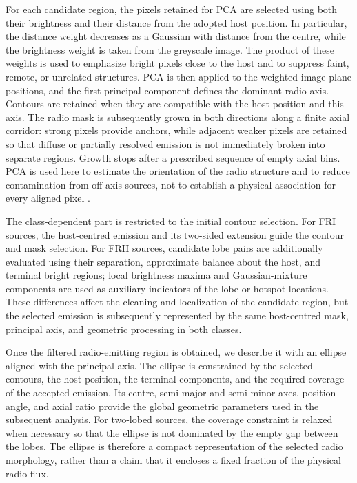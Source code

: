 \documentclass{aa}
\begin{document}
For each candidate region, the pixels retained for PCA are selected using both their brightness and their distance from the adopted host position. In particular, the distance weight decreases as a Gaussian with distance from the centre, while the brightness weight is taken from the greyscale image. The product of these weights is used to emphasize bright pixels close to the host and to suppress faint, remote, or unrelated structures. PCA is then applied to the weighted image-plane positions, and the first principal component defines the dominant radio axis. Contours are retained when they are compatible with the host position and this axis. The radio mask is subsequently grown in both directions along a finite axial corridor: strong pixels provide anchors, while adjacent weaker pixels are retained so that diffuse or partially resolved emission is not immediately broken into separate regions. Growth stops after a prescribed sequence of empty axial bins. PCA is used here to estimate the orientation of the radio structure and to reduce contamination from off-axis sources, not to establish a physical association for every aligned pixel \citep[e.g., PCA tomography,][]{hofmann_kernel_2008,steiner_pca_2009}.

The class-dependent part is restricted to the initial contour selection. For FRI sources, the host-centred emission and its two-sided extension guide the contour and mask selection. For FRII sources, candidate lobe pairs are additionally evaluated using their separation, approximate balance about the host, and terminal bright regions; local brightness maxima and Gaussian-mixture components are used as auxiliary indicators of the lobe or hotspot locations. These differences affect the cleaning and localization of the candidate region, but the selected emission is subsequently represented by the same host-centred mask, principal axis, and geometric processing in both classes.

Once the filtered radio-emitting region is obtained, we describe it with an ellipse aligned with the principal axis. The ellipse is constrained by the selected contours, the host position, the terminal components, and the required coverage of the accepted emission. Its centre, semi-major and semi-minor axes, position angle, and axial ratio provide the global geometric parameters used in the subsequent analysis. For two-lobed sources, the coverage constraint is relaxed when necessary so that the ellipse is not dominated by the empty gap between the lobes. The ellipse is therefore a compact representation of the selected radio morphology, rather than a claim that it encloses a fixed fraction of the physical radio flux.
\end{document}
